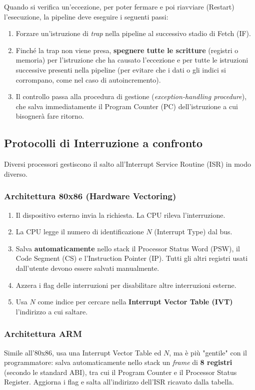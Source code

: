 Quando si verifica un'eccezione, per poter fermare e poi riavviare (Restart) l'esecuzione, la pipeline deve eseguire i seguenti passi:
\begin{enumerate}
    \item Forzare un'istruzione di \textit{trap} nella pipeline al successivo stadio di Fetch (IF).
    \item Finché la trap non viene presa, \textbf{spegnere tutte le scritture} (registri o memoria) per l'istruzione che ha causato l'eccezione e per tutte le istruzioni successive presenti nella pipeline (per evitare che i dati o gli indici si corrompano, come nel caso di autoincremento).
    \item Il controllo passa alla procedura di gestione (\textit{exception-handling procedure}), che salva immediatamente il Program Counter (PC) dell'istruzione a cui bisognerà fare ritorno.
\end{enumerate}

\subsection{Protocolli di Interruzione a confronto}
Diversi processori gestiscono il salto all'Interrupt Service Routine (ISR) in modo diverso.

\subsubsection{Architettura 80x86 (Hardware Vectoring)}
\begin{enumerate}
    \item Il dispositivo esterno invia la richiesta. La CPU rileva l'interruzione.
    \item La CPU legge il numero di identificazione $N$ (Interrupt Type) dal bus.
    \item Salva \textbf{automaticamente} nello stack il Processor Status Word (PSW), il Code Segment (CS) e l'Instruction Pointer (IP). Tutti gli altri registri usati dall'utente devono essere salvati manualmente.
    \item Azzera i flag delle interruzioni per disabilitare altre interruzioni esterne.
    \item Usa $N$ come indice per cercare nella \textbf{Interrupt Vector Table (IVT)} l'indirizzo a cui saltare.
\end{enumerate}

\subsubsection{Architettura ARM}
Simile all'80x86, usa una Interrupt Vector Table ed $N$, ma è più "gentile" con il programmatore: salva automaticamente nello stack un \textit{frame} di \textbf{8 registri} (secondo le standard ABI), tra cui il Program Counter e il Processor Status Register. Aggiorna i flag e salta all'indirizzo dell'ISR ricavato dalla tabella.

